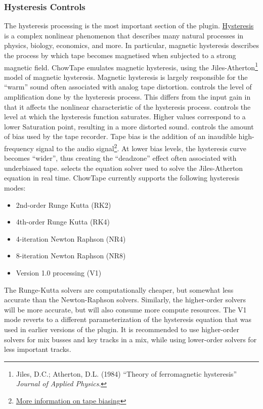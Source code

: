 \documentclass[landscape,twocolumn,a5paper]{manual}
\begin{document}
\subsubsection{Hysteresis Controls}
The hysteresis processing is the most important section of the
plugin. \href{https://en.wikipedia.org/wiki/Hysteresis}{Hysteresis}
is a complex nonlinear phenomenon that describes many
natural processes in physics, biology, economics, and more.
In particular, magnetic hysteresis describes the process by
which tape becomes magnetised when subjected to a strong magnetic
field. ChowTape emulates magnetic hysteresis, using the
Jiles-Atherton\footnote{Jiles, D.C.; Atherton, D.L. (1984) ``Theory of ferromagnetic hysteresis'' \textit{Journal of Applied Physics}.}
model of magnetic hysteresis. Magnetic hysteresis is largely
responsible for the ``warm'' sound often associated with
analog tape distortion.
\newpar
{} controls the level of amplification done by
the hysteresis process. This differs from the input gain in that
it affects the nonlinear characteristic of the hysteresis process.
\newpar
{} controls the level at which the hysteresis
function saturates. Higher values correspond to a lower Saturation
point, resulting in a more distorted sound.
\newpar
{} controls the amount of bias used by the tape
recorder. Tape bias is the addition of an inaudible high-frequency
signal to the audio signal\footnote{\href{https://hccc.org.uk/acbias.html}{More information on tape biasing}}.
At lower bias levels, the hysteresis curve becomes ``wider'',
thus creating the ``deadzone'' effect often associated with
underbiased tape.
\newpar
{} selects the equation solver used
to solve the Jiles-Atherton equation in real time. ChowTape
currently supports the following hysteresis modes:
\renewcommand{\labelitemi}{\textendash}
\begin{itemize}
    \itemsep-1mm
    \item 2nd-order Runge Kutta (RK2)
    \item 4th-order Runge Kutta (RK4)
    \item 4-iteration Newton Raphson (NR4)
    \item 8-iteration Newton Raphson (NR8)
    \item Version 1.0 processing (V1)
\end{itemize}
%
The Runge-Kutta solvers are computationally cheaper, but
somewhat less accurate than the Newton-Raphson solvers.
Similarly, the higher-order solvers will be more accurate,
but will also consume more compute resources. The V1 mode
reverts to a different parameterization of the hysteresis
equation that was used in earlier versions of the plugin. It
is recommended to use higher-order solvers for mix busses
and key tracks in a mix, while using lower-order solvers for
less important tracks.
\end{document}
